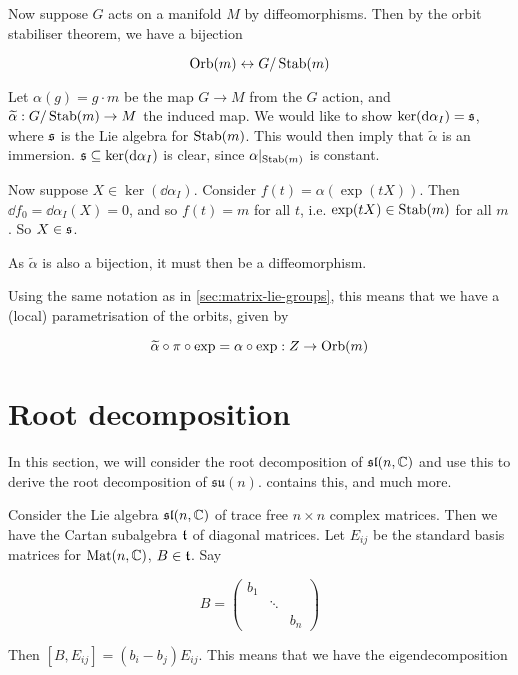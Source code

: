 \documentclass{article}
\newcommand{\su}{\mathfrak{su}}
\renewcommand{\sl}{\mathfrak{sl}}
\renewcommand{\tilde}{\widetilde}
\begin{document}
Now suppose \(G\) acts on a manifold \(M\) by diffeomorphisms. Then by the orbit stabiliser theorem, we have a bijection

\[\operatorname{Orb}(m) \leftrightarrow G/\operatorname{Stab}(m)\]

Let \(\alpha(g) = g \cdot m\) be the map \(G \to M\) from the \(G\) action, and \(\tilde\alpha : G/\Stab(m) \to M\) the induced map. We would like to show \(\ker(\dd\alpha_I) = \mathfrak{s}\), where \(\mathfrak{s}\) is the Lie algebra for \(\operatorname{Stab}(m)\). This would then imply that \(\tilde\alpha\) is an immersion. \(\mathfrak{s} \subseteq \ker(\dd\alpha_I)\) is clear, since \(\alpha\vert_{\operatorname{Stab}(m)}\) is constant.

Now suppose \(X \in \ker(\dd\alpha_I)\). Consider \(f(t) = \alpha(\exp(tX))\). Then \(\dd f_0 = \dd \alpha_I(X) = 0\), and so \(f(t) = m\) for all \(t\), i.e. \(\exp(tX) \in \operatorname{Stab}(m)\) for all \(m\). So \(X \in \mathfrak{s}\). 

As \(\tilde\alpha\) is also a bijection, it must then be a diffeomorphism.

Using the same notation as in \cref{sec:matrix-lie-groups}, this means that we have a (local) parametrisation of the orbits, given by

\begin{equation}
    \label{eq:param}
    \tilde\alpha \circ \pi \circ \exp = \alpha \circ \exp : Z \to \Orb(m)
\end{equation}

\section{Root decomposition}

\label{sec:root}

In this section, we will consider the root decomposition of \(\sl(n, \C)\) and use this to derive the root decomposition of \(\su(n)\).  \cite[\S 8]{humphreys} contains this, and much more.

Consider the Lie algebra \(\sl(n, \C)\) of trace free \(n \times n\) complex matrices. Then we have the Cartan subalgebra \(\mathfrak{t}\) of diagonal matrices. Let \(E_{ij}\) be the standard basis matrices for \(\operatorname{Mat}(n, \mathbb{C})\), \(B \in \mathfrak{t}\). Say

\[B = \begin{pmatrix}
    b_1 \\
    & \ddots \\
    & & b_n
\end{pmatrix}\]

Then \([B, E_{ij}] = (b_i - b_j)E_{ij}\). This means that we have the eigendecomposition
\end{document}
